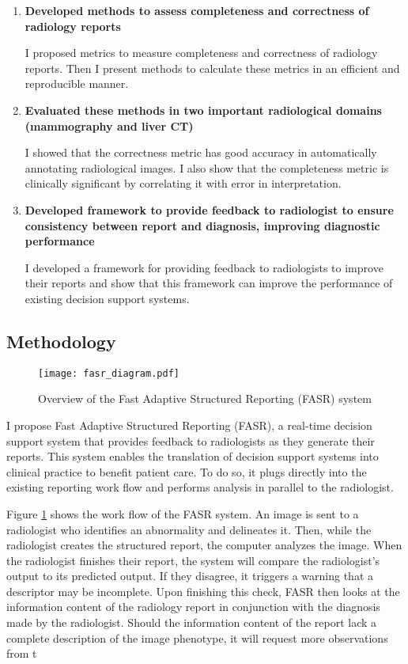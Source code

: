 \begin{enumerate}
	\item \textbf{Developed methods to assess completeness and correctness of radiology reports}
	
	I proposed metrics to measure completeness and correctness of radiology reports. Then I present methods to calculate these metrics in an efficient and reproducible manner.
	
	\item \textbf{Evaluated these methods in two important radiological domains (mammography and liver CT)}
	
	I showed that the correctness metric has good accuracy in automatically annotating radiological images. I also show that the completeness metric is clinically significant by correlating it with error in interpretation.
	
	\item \textbf{Developed framework to provide feedback to radiologist to ensure consistency between report and diagnosis, improving diagnostic performance}
	
	I developed a framework for providing feedback to radiologists to improve their reports and show that this framework can improve the performance of existing decision support systems.
\end{enumerate}

\subsection{Methodology}

\begin{figure}[h]
	\centering
	\texttt{[image: fasr\_diagram.pdf]}
	\caption{Overview of the Fast Adaptive Structured Reporting (FASR) system}
	\label{fig:fasr_diagram}
\end{figure}

I propose Fast Adaptive Structured Reporting (FASR), a real-time decision support system that provides feedback to radiologists as they generate their reports. This system enables the translation of decision support systems into clinical practice to benefit patient care. To do so, it plugs directly into the existing reporting work flow and performs analysis in parallel to the radiologist.

Figure \ref{fig:fasr_diagram} shows the work flow of the FASR system. An image is sent to a radiologist who identifies an abnormality and delineates it. Then, while the radiologist creates the structured report, the computer analyzes the image. When the radiologist finishes their report, the system will compare the radiologist's output to its predicted output. If they disagree, it triggers a warning that a descriptor may be incomplete. Upon finishing this check, FASR then looks at the information content of the radiology report in conjunction with the diagnosis made by the radiologist. Should the information content of the report lack a complete description of the image phenotype, it will request more observations from t


